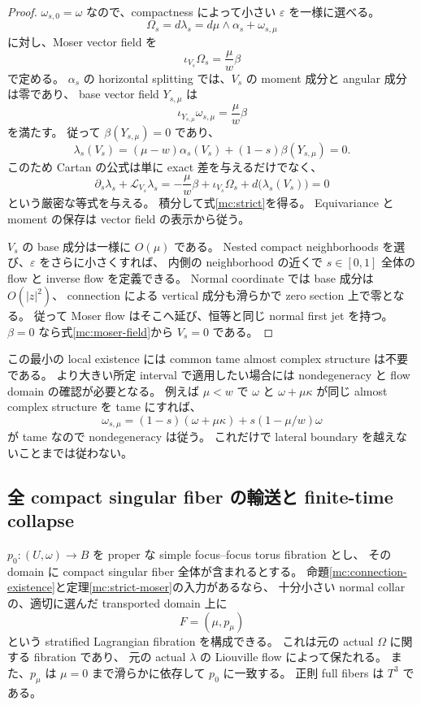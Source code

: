 \begin{proof}
$\omega_{s,0}=\omega$ なので、compactness によって小さい $\varepsilon$ を一様に選べる。
\[
 \Omega_s=d\lambda_s=d\mu\wedge\alpha_s+\omega_{s,\mu}
\]
に対し、Moser vector field を
\begin{equation}
 \iota_{V_s}\Omega_s=\frac{\mu}{w}\beta
 \label{mc:moser-field}
\end{equation}
で定める。
$\alpha_s$ の horizontal splitting では、$V_s$ の moment 成分と angular 成分は零であり、
base vector field $Y_{s,\mu}$ は
\[
 \iota_{Y_{s,\mu}}\omega_{s,\mu}=\frac{\mu}{w}\beta
\]
を満たす。
従って $\beta(Y_{s,\mu})=0$ であり、
\[
 \lambda_s(V_s)
 =(\mu-w)\alpha_s(V_s)+(1-s)\beta(Y_{s,\mu})=0.
\]
このため Cartan の公式は単に exact 差を与えるだけでなく、
\[
 \partial_s\lambda_s+\mathcal L_{V_s}\lambda_s
 =-\frac{\mu}{w}\beta+\iota_{V_s}\Omega_s
   +d\bigl(\lambda_s(V_s)\bigr)=0
\]
という厳密な等式を与える。
積分して式\eqref{mc:strict}を得る。
Equivariance と moment の保存は vector field の表示から従う。

$V_s$ の base 成分は一様に $O(\mu)$ である。
Nested compact neighborhoods を選び、$\varepsilon$ をさらに小さくすれば、
内側の neighborhood の近くで $s\in[0,1]$ 全体の flow と inverse flow を定義できる。
Normal coordinate では base 成分は $O(|z|^2)$、
connection による vertical 成分も滑らかで zero section 上で零となる。
従って Moser flow はそこへ延び、恒等と同じ normal first jet を持つ。
$\beta=0$ なら式\eqref{mc:moser-field}から $V_s=0$ である。
\end{proof}

この最小の local existence には common tame almost complex structure は不要である。
より大きい所定 interval で適用したい場合には nondegeneracy と flow domain の確認が必要となる。
例えば $\mu<w$ で $\omega$ と $\omega+\mu\kappa$ が同じ almost complex structure を tame にすれば、
\[
 \omega_{s,\mu}
 =(1-s)(\omega+\mu\kappa)+s(1-\mu/w)\omega
\]
が tame なので nondegeneracy は従う。
これだけで lateral boundary を越えないことまでは従わない。

\subsection{全 compact singular fiber の輸送と finite-time collapse}
\label{mc:fibration}

\begin{corollary}
\label{mc:moving-fibration}
$p_0:(U,\omega)\to B$ を proper な simple focus--focus torus fibration とし、
その domain に compact singular fiber 全体が含まれるとする。
命題\ref{mc:connection-existence}と定理\ref{mc:strict-moser}の入力があるなら、
十分小さい normal collar の、適切に選んだ transported domain 上に
\[
 F=(\mu,p_\mu)
\]
という stratified Lagrangian fibration を構成できる。
これは元の actual $\Omega$ に関する fibration であり、
元の actual $\lambda$ の Liouville flow によって保たれる。
また、$p_\mu$ は $\mu=0$ まで滑らかに依存して $p_0$ に一致する。
正則 full fibers は $T^3$ である。
\end{corollary}

